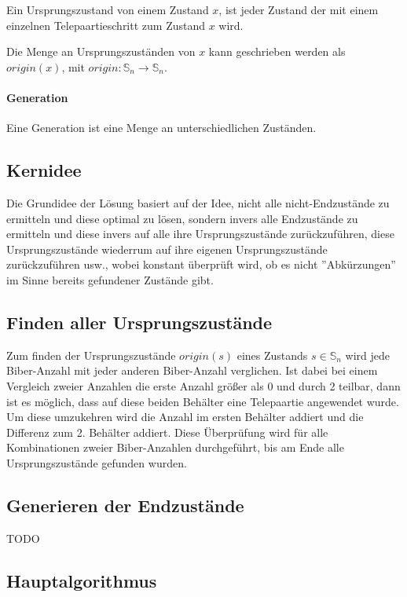 \documentclass[a4paper,10pt,ngerman]{scrartcl}
\begin{document}
Ein Ursprungszustand von einem Zustand \(x\), ist jeder Zustand der mit einem einzelnen Telepaartieschritt zum Zustand \(x\) wird.

Die Menge an Ursprungszuständen von \(x\) kann geschrieben werden als \(origin(x)\), mit \(origin : \mathbb{S}_n \to \mathbb{S}_n \).

\paragraph{Generation} \label{def:generation}

Eine Generation ist eine Menge an unterschiedlichen Zuständen.

\subsection{Kernidee}

Die Grundidee der Lösung basiert auf der Idee, nicht alle nicht-Endzustände zu ermitteln und diese optimal zu lösen, sondern invers alle Endzustände zu ermitteln und diese invers auf alle ihre Ursprungszustände zurückzuführen, diese Ursprungszustände wiederrum auf ihre eigenen Ursprungszustände zurückzuführen usw., wobei konstant überprüft wird, ob es nicht ''Abkürzungen'' im Sinne bereits gefundener Zustände gibt.

\subsection{Finden aller Ursprungszustände} \label{alg:origin}

Zum finden der Ursprungszustände \(origin(s)\) eines Zustands \(s \in \mathbb{S}_n\) wird jede Biber-Anzahl mit jeder anderen Biber-Anzahl verglichen. Ist dabei bei einem Vergleich zweier Anzahlen die erste Anzahl größer als 0 und durch 2 teilbar, dann ist es möglich, dass auf diese beiden Behälter eine Telepaartie angewendet wurde. Um diese umzukehren wird die Anzahl im ersten Behälter addiert und die Differenz zum 2. Behälter addiert.
Diese Überprüfung wird für alle Kombinationen zweier Biber-Anzahlen durchgeführt, bis am Ende alle Ursprungszustände gefunden wurden.

\subsection{Generieren der Endzustände} \label{alg:target}

TODO

\subsection{Hauptalgorithmus}
\end{document}
